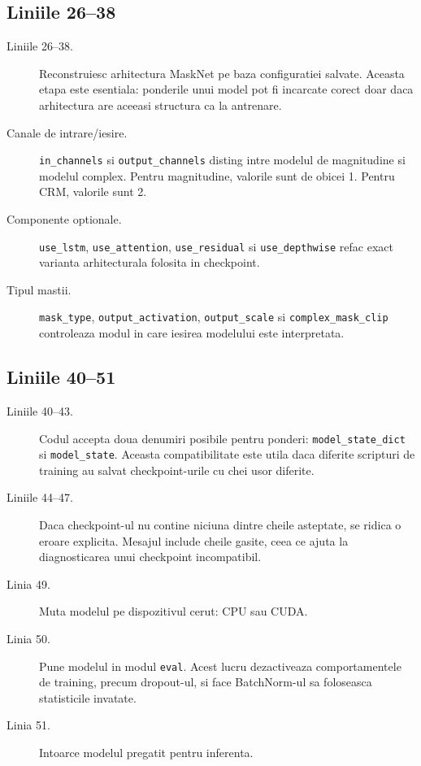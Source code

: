\documentclass[12pt,a4paper]{report}
\newcommand{\codechunk}[2]{%
\subsection*{Liniile #1--#2}

}
\begin{document}
\codechunk{26}{38}

\begin{description}
    \item[Liniile 26--38.] Reconstruiesc arhitectura MaskNet pe baza configuratiei
    salvate. Aceasta etapa este esentiala: ponderile unui model pot fi incarcate
    corect doar daca arhitectura are aceeasi structura ca la antrenare.

    \item[Canale de intrare/iesire.] \texttt{in\_channels} si \texttt{output\_channels}
    disting intre modelul de magnitudine si modelul complex. Pentru magnitudine,
    valorile sunt de obicei 1. Pentru CRM, valorile sunt 2.

    \item[Componente optionale.] \texttt{use\_lstm}, \texttt{use\_attention},
    \texttt{use\_residual} si \texttt{use\_depthwise} refac exact varianta arhitecturala
    folosita in checkpoint.

    \item[Tipul mastii.] \texttt{mask\_type}, \texttt{output\_activation},
    \texttt{output\_scale} si \texttt{complex\_mask\_clip} controleaza modul in care
    iesirea modelului este interpretata.
\end{description}

\codechunk{40}{51}

\begin{description}
    \item[Liniile 40--43.] Codul accepta doua denumiri posibile pentru ponderi:
    \texttt{model\_state\_dict} si \texttt{model\_state}. Aceasta compatibilitate
    este utila daca diferite scripturi de training au salvat checkpoint-urile cu
    chei usor diferite.

    \item[Liniile 44--47.] Daca checkpoint-ul nu contine niciuna dintre cheile
    asteptate, se ridica o eroare explicita. Mesajul include cheile gasite, ceea
    ce ajuta la diagnosticarea unui checkpoint incompatibil.

    \item[Linia 49.] Muta modelul pe dispozitivul cerut: CPU sau CUDA.

    \item[Linia 50.] Pune modelul in modul \texttt{eval}. Acest lucru dezactiveaza
    comportamentele de training, precum dropout-ul, si face BatchNorm-ul sa foloseasca
    statisticile invatate.

    \item[Linia 51.] Intoarce modelul pregatit pentru inferenta.
\end{description}
\end{document}
